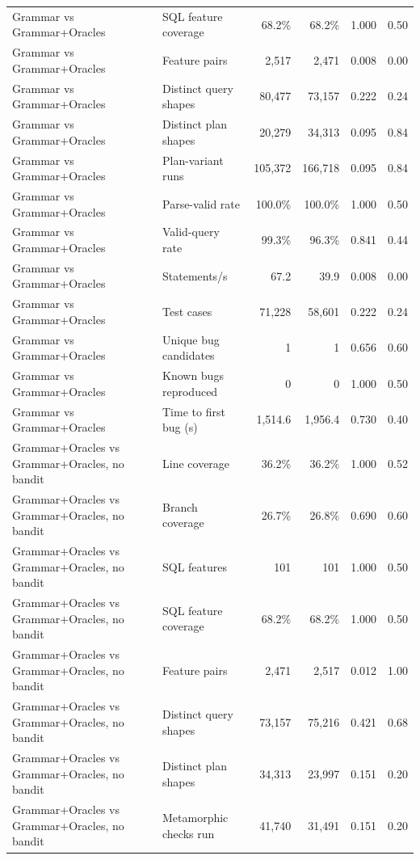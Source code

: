 \begin{table}[t]
\begin{tabular}{llrrrr}
    Grammar vs Grammar+Oracles & SQL feature coverage & 68.2\% & 68.2\% & 1.000 & 0.50 \\
    Grammar vs Grammar+Oracles & Feature pairs & 2{,}517 & 2{,}471 & 0.008 & 0.00 \\
    Grammar vs Grammar+Oracles & Distinct query shapes & 80{,}477 & 73{,}157 & 0.222 & 0.24 \\
    Grammar vs Grammar+Oracles & Distinct plan shapes & 20{,}279 & 34{,}313 & 0.095 & 0.84 \\
    Grammar vs Grammar+Oracles & Plan-variant runs & 105{,}372 & 166{,}718 & 0.095 & 0.84 \\
    Grammar vs Grammar+Oracles & Parse-valid rate & 100.0\% & 100.0\% & 1.000 & 0.50 \\
    Grammar vs Grammar+Oracles & Valid-query rate & 99.3\% & 96.3\% & 0.841 & 0.44 \\
    Grammar vs Grammar+Oracles & Statements/s & 67.2 & 39.9 & 0.008 & 0.00 \\
    Grammar vs Grammar+Oracles & Test cases & 71{,}228 & 58{,}601 & 0.222 & 0.24 \\
    Grammar vs Grammar+Oracles & Unique bug candidates & 1 & 1 & 0.656 & 0.60 \\
    Grammar vs Grammar+Oracles & Known bugs reproduced & 0 & 0 & 1.000 & 0.50 \\
    Grammar vs Grammar+Oracles & Time to first bug (s) & 1{,}514.6 & 1{,}956.4 & 0.730 & 0.40 \\
    Grammar+Oracles vs Grammar+Oracles, no bandit & Line coverage & 36.2\% & 36.2\% & 1.000 & 0.52 \\
    Grammar+Oracles vs Grammar+Oracles, no bandit & Branch coverage & 26.7\% & 26.8\% & 0.690 & 0.60 \\
    Grammar+Oracles vs Grammar+Oracles, no bandit & SQL features & 101 & 101 & 1.000 & 0.50 \\
    Grammar+Oracles vs Grammar+Oracles, no bandit & SQL feature coverage & 68.2\% & 68.2\% & 1.000 & 0.50 \\
    Grammar+Oracles vs Grammar+Oracles, no bandit & Feature pairs & 2{,}471 & 2{,}517 & 0.012 & 1.00 \\
    Grammar+Oracles vs Grammar+Oracles, no bandit & Distinct query shapes & 73{,}157 & 75{,}216 & 0.421 & 0.68 \\
    Grammar+Oracles vs Grammar+Oracles, no bandit & Distinct plan shapes & 34{,}313 & 23{,}997 & 0.151 & 0.20 \\
    Grammar+Oracles vs Grammar+Oracles, no bandit & Metamorphic checks run & 41{,}740 & 31{,}491 & 0.151 & 0.20 \\

\end{tabular}
\end{table}
